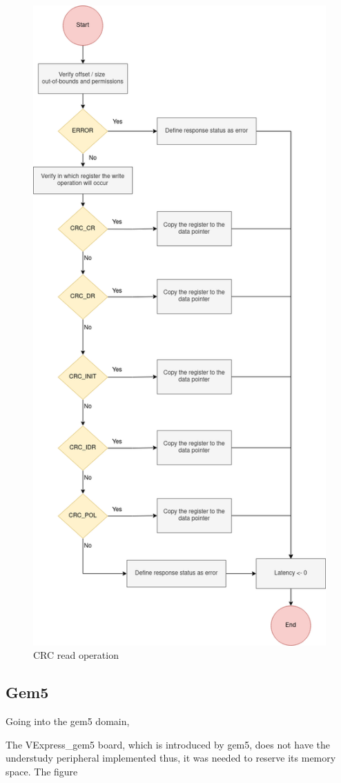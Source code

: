 \begin{figure}[]
	\centering
 	\includegraphics[width=0.6\linewidth]{Images/CRC_read.png}  %
 	\caption{CRC read operation}
	 \label{fig_CRC_read}
\end{figure}


\subsection{Gem5}

Going into the gem5 domain, 

The VExpress\_gem5 board, which is introduced by gem5, does not have the understudy peripheral implemented thus, it was 
needed to reserve its memory space. The figure 


